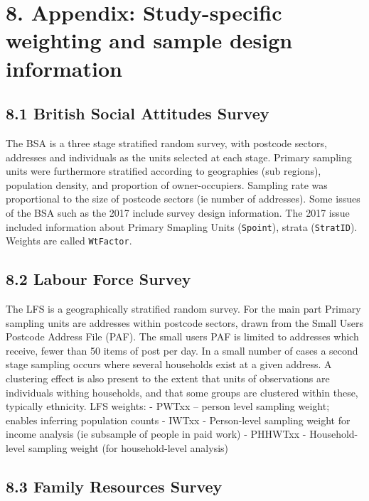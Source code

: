 \documentclass[
  14,
  a4paper,
  DIV=11,
  numbers=noendperiod]{scrartcl}
\begin{document}
\hypertarget{appendix-study-specific-weighting-and-sample-design-information}{%
\section{8. Appendix: Study-specific weighting and sample design
information}\label{appendix-study-specific-weighting-and-sample-design-information}}

\hypertarget{british-social-attitudes-survey}{%
\subsection{8.1 British Social Attitudes
Survey}\label{british-social-attitudes-survey}}

The BSA is a three stage stratified random survey, with postcode
sectors, addresses and individuals as the units selected at each stage.
Primary sampling units were furthermore stratified according to
geographies (sub regions), population density, and proportion of
owner-occupiers. Sampling rate was proportional to the size of postcode
sectors (ie number of addresses). Some issues of the BSA such as the
2017 include survey design information. The 2017 issue included
information about Primary Smapling Units (\texttt{Spoint}), strata
(\texttt{StratID}). Weights are called \texttt{WtFactor}.

\hypertarget{labour-force-survey}{%
\subsection{8.2 Labour Force Survey}\label{labour-force-survey}}

The LFS is a geographically stratified random survey. For the main part
Primary sampling units are addresses within postcode sectors, drawn from
the Small Users Postcode Address File (PAF). The small users PAF is
limited to addresses which receive, fewer than 50 items of post per day.
In a small number of cases a second stage sampling occurs where several
households exist at a given address. A clustering effect is also present
to the extent that units of observations are individuals withing
households, and that some groups are clustered within these, typically
ethnicity. LFS weights: - PWTxx -- person level sampling weight; enables
inferring population counts - IWTxx - Person-level sampling weight for
income analysis (ie subsample of people in paid work) - PHHWTxx -
Household-level sampling weight (for household-level analysis)

\hypertarget{family-resources-survey}{%
\subsection{8.3 Family Resources Survey}\label{family-resources-survey}}
\end{document}
